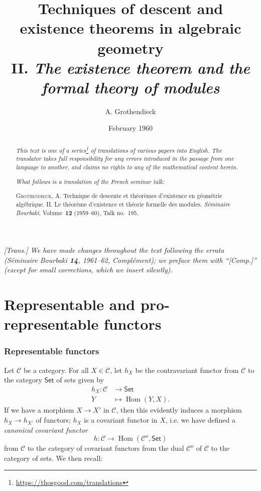 \documentclass{article}
\title{Techniques of descent and existence theorems in algebraic geometry\\II. \emph{The existence theorem and the formal theory of modules}}
\author{A. Grothendieck}
\date{February 1960}
\newcommand{\doctype}{French seminar talk}
\newcommand{\origcit}{%
  \textsc{Grothendieck, A.}
  Technique de descente et th\'{e}or\`{e}mes d'existence en g\'{e}om\'{e}trie alg\'{e}brique. II. Le th\'{e}or\`{e}me d'existence et th\'{e}orie formelle des modules.
  \emph{S\'{e}minaire Bourbaki}, Volume~\textbf{12} (1959--60), Talk no.~195.%
}
\renewcommand{\cal}[1]{{\mathcal{#1}}}
\newcommand{\Set}{\mathsf{Set}}
\DeclareMathOperator{\Hom}{Hom}
\newcommand{\oldpage}[1]{\marginpar{\footnotesize$\Big\vert$ \textit{p.~#1}}}
\begin{document}
\maketitle
\thispagestyle{fancy}

\renewcommand{\abstractname}{Translator's note.}

\begin{abstract}
  \renewcommand*{\thefootnote}{\fnsymbol{footnote}}
  \emph{This text is one of a series\footnote{\url{https://thosgood.com/translations}} of translations of various papers into English.}
  \emph{The translator takes full responsibility for any errors introduced in the passage from one language to another, and claims no rights to any of the mathematical content herein.}

  \medskip
  
  \emph{What follows is a translation of the \doctype:}

  \medskip\noindent
  \origcit
\end{abstract}

\setcounter{footnote}{0}

\setcounter{tocdepth}{1}
\tableofcontents



\subsubsection*{}

\emph{[Trans.] We have made changes throughout the text following the errata (\emph{S\'{e}minaire Bourbaki} \textbf{14}, 1961--62, Compl\'{e}ment); we preface them with ``[Comp.]'' (except for small corrections, which we insert silently).}
\medskip

\oldpage{195-01}
\part{Representable and pro-representable functors}
\label{A}

\section{Representable functors}
\label{A.1}

Let $\cal{C}$ be a category.
For all $X\in\cal{C}$, let $h_X$ be the contravariant functor from $\cal{C}$ to the category $\Set$ of sets given by
\[
  \begin{aligned}
    h_X\colon \cal{C} &\to \Set
  \\Y&\mapsto \Hom(Y,X).
  \end{aligned}
\]
If we have a morphism $X\to X'$ in $\cal{C}$, then this evidently induces a morphism $h_X\to h_{X'}$ of functors;
$h_X$ is a covariant functor in $X$, i.e. we have defined a \emph{canonical covariant functor}
\[
  h\colon \cal{C} \to \Hom(\cal{C}^o,\Set)
\]
from $\cal{C}$ to the category of covariant functors from the dual $\cal{C}^o$ of $\cal{C}$ to the category of sets.
We then recall:
\end{document}
